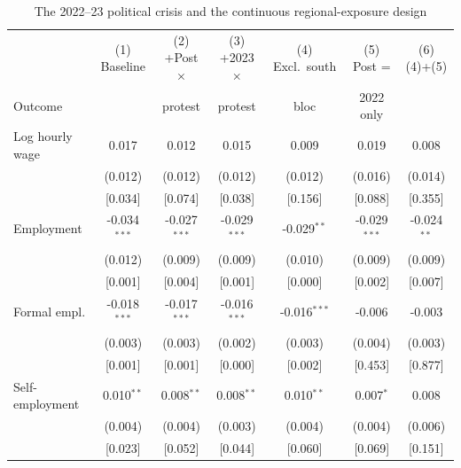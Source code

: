 \begin{table}[!tbp]\centering
\caption{The 2022--23 political crisis and the continuous regional-exposure design}\label{tab:crisis}
\begin{threeparttable}
\footnotesize
\setlength{\tabcolsep}{3pt}
\begin{tabular}{lcccccc}
\toprule
& (1) Baseline & (2) +Post$\times$ & (3) +2023$\times$ & (4) Excl.\ south & (5) Post = & (6) (4)+(5) \\
Outcome & & protest & protest & bloc & 2022 only & \\
\midrule
Log hourly wage & 0.017 & 0.012 & 0.015 & 0.009 & 0.019 & 0.008 \\
 & (0.012) & (0.012) & (0.012) & (0.012) & (0.016) & (0.014) \\
 & [0.034] & [0.074] & [0.038] & [0.156] & [0.088] & [0.355] \\
Employment & -0.034$^{***}$ & -0.027$^{***}$ & -0.029$^{***}$ & -0.029$^{**}$ & -0.029$^{***}$ & -0.024$^{**}$ \\
 & (0.012) & (0.009) & (0.009) & (0.010) & (0.009) & (0.009) \\
 & [0.001] & [0.004] & [0.001] & [0.000] & [0.002] & [0.007] \\
Formal empl. & -0.018$^{***}$ & -0.017$^{***}$ & -0.016$^{***}$ & -0.016$^{***}$ & -0.006 & -0.003 \\
 & (0.003) & (0.003) & (0.002) & (0.003) & (0.004) & (0.003) \\
 & [0.001] & [0.001] & [0.000] & [0.002] & [0.453] & [0.877] \\
Self-employment & 0.010$^{**}$ & 0.008$^{**}$ & 0.008$^{**}$ & 0.010$^{**}$ & 0.007$^{*}$ & 0.008 \\
 & (0.004) & (0.004) & (0.003) & (0.004) & (0.004) & (0.006) \\
 & [0.023] & [0.052] & [0.044] & [0.060] & [0.069] & [0.151] \\
\bottomrule
\end{tabular}
\begin{tablenotes}\footnotesize

\end{tablenotes}
\end{threeparttable}
\end{table}
